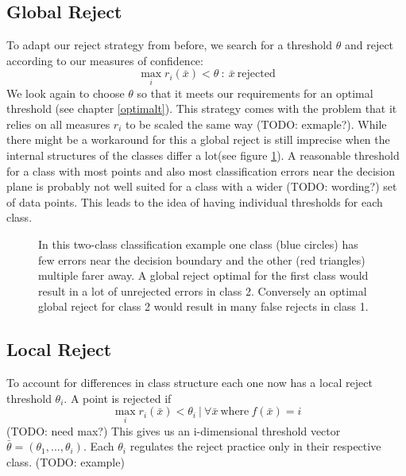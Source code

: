 \subsection{Global Reject}
To adapt our reject strategy from before, we search for a threshold $\theta$ and reject according to our measures of confidence:
$$ \operatorname*{max}_i r_i(\bar{x}) < \theta \ : \ \bar{x} \ \text{rejected}  $$
We look again to choose $\theta$ so that it meets our requirements for an optimal threshold (see chapter \ref{optimalt}). This strategy comes with the problem that it relies on all measures $r_i$ to be scaled the same way (TODO: exmaple?). While there might be a workaround for this a global reject is still imprecise when the internal structures of the classes differ a lot(see figure \ref{classStructure}). A reasonable threshold for a class with most points and also most classification errors near the decision plane is probably not well suited for a class with a wider (TODO: wording?) set of data points. This leads to the idea of having individual thresholds for each class.

\begin{figure}[!htbp]
\centering
\caption{In this two-class classification example one class (blue circles) has few errors near the decision boundary and the other (red triangles) multiple farer away. A global reject optimal for the first class would result in a lot of unrejected errors in class 2. Conversely an optimal global reject for class 2 would result in many false rejects in class 1.}
\label{classStructure}
\end{figure}

\subsection{Local Reject}
To account for differences in class structure each one now has a local reject threshold $\theta_i$. A point is rejected if
$$ \operatorname*{max}_i r_i(\bar{x}) < \theta_i \ | \ \forall \bar{x} \  \text{where} \ f(\bar{x}) = i $$ (TODO: need max?)
This gives us an i-dimensional threshold vector $\bar{\theta} = (\theta_1,...,\theta_i)$. Each $\theta_i$ regulates the reject practice only in their respective class. (TODO: example)

